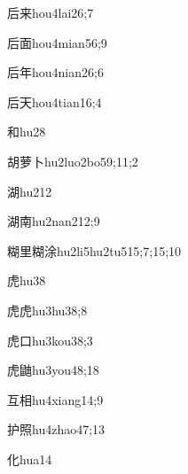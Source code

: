 \begin{verbete}{后来}{hou4lai2}{6;7}
\end{verbete}
\begin{verbete}{后面}{hou4mian5}{6;9}
\end{verbete}
\begin{verbete}{后年}{hou4nian2}{6;6}
\end{verbete}
\begin{verbete}{后天}{hou4tian1}{6;4}
\end{verbete}
\begin{verbete}{和}{hu2}{8}
\end{verbete}
\begin{verbete}{胡萝卜}{hu2luo2bo5}{9;11;2}
\end{verbete}
\begin{verbete}{湖}{hu2}{12}
\end{verbete}
\begin{verbete}{湖南}{hu2nan2}{12;9}
\end{verbete}
\begin{verbete}{糊里糊涂}{hu2li5hu2tu5}{15;7;15;10}
\end{verbete}
\begin{verbete}{虎}{hu3}{8}
\end{verbete}
\begin{verbete}{虎虎}{hu3hu3}{8;8}
\end{verbete}
\begin{verbete}{虎口}{hu3kou3}{8;3}
\end{verbete}
\begin{verbete}{虎鼬}{hu3you4}{8;18}
\end{verbete}
\begin{verbete}{互相}{hu4xiang1}{4;9}
\end{verbete}
\begin{verbete}{护照}{hu4zhao4}{7;13}
\end{verbete}
\begin{verbete}{化}{hua1}{4}
\end{verbete}
